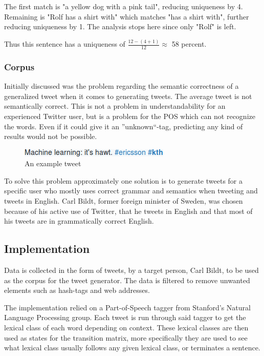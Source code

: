 \documentclass[a4paper,12pt]{article}
\begin{document}
The first match is "a yellow dog with a pink tail", reducing uniqueness by 4. Remaining is "Rolf has a shirt with" which matches "has a shirt with", further reducing uniqueness by 1. The analysis stops here since only "Rolf" is left.

Thus this sentence has a uniqueness of $\frac{12 - (4 + 1)}{12} \approx$ 58 percent.

\subsubsection{Corpus}
Initially discussed was the problem regarding the semantic correctness of a generalized tweet when it comes to generating tweets.
The average tweet is not semantically correct. This is not a problem in understandability for an experienced Twitter user,
but is a problem for the POS which can not recognize the words. Even if it could give it an ''unknown``-tag, predicting any kind of results would not be possible.

\begin{figure}[h!]
  \centering
  \includegraphics[width=0.6\linewidth]{machine_learning}
  \caption{An example tweet}
\end{figure}

To solve this problem approximately one solution is to generate tweets for a specific user who mostly uses correct grammar and semantics when tweeting and tweets in English.
Carl Bildt, former foreign minister of Sweden, was chosen because of his active use of Twitter, 
that he tweets in English and that most of his tweets are in grammatically correct English.

\subsection{Implementation}
\label{sec:impl}
Data is collected in the form of tweets, by a target person, Carl Bildt, to be used as the corpus for the tweet generator. The data is filtered to remove unwanted elements such as hash-tags and web addresses.

The implementation relied on a Part-of-Speech tagger from Stanford's Natural Language Processing group. Each tweet is run through said tagger to get the lexical class of each word depending on context.
These lexical classes are then used as states for the transition matrix, more specifically they are used to see what lexical class usually follows any given lexical class, or terminates a sentence.
\end{document}
